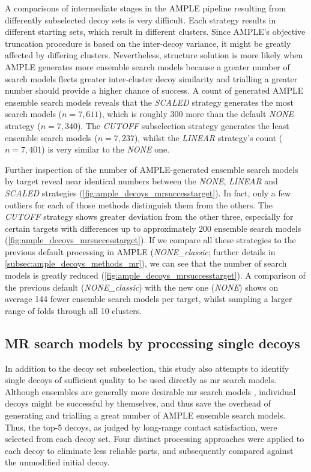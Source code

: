 A comparisons of intermediate stages in the AMPLE pipeline resulting from differently subselected decoy sets is very difficult. Each strategy results in different starting sets, which result in different clusters. Since AMPLE's objective truncation procedure is based on the inter-decoy variance, it might be greatly affected by differing clusters. Nevertheless, structure solution is more likely when AMPLE generates more ensemble search models because a greater number of search models flects greater inter-cluster decoy similarity and trialling a greater number should provide a higher chance of success. A count of generated AMPLE ensemble search models reveals that the \textit{SCALED} strategy generates the most search models ($n=7,611$), which is roughly 300 more than the default \textit{NONE} strategy ($n=7,340$). The \textit{CUTOFF} subselection strategy generates the least ensemble search models ($n=7,237$), whilst the \textit{LINEAR} strategy's count ($n=7,401$) is very similar to the \textit{NONE} one.

Further inspection of the number of AMPLE-generated ensemble search models by target reveal near identical numbers between the \textit{NONE}, \textit{LINEAR} and \textit{SCALED} strategies (\cref{fig:ample_decoys_mrsuccesstarget}). In fact, only a few outliers for each of those methods distinguish them from the others. The \textit{CUTOFF} strategy shows greater deviation from the other three, especially for certain targets with differences up to approximately 200 ensemble search models (\cref{fig:ample_decoys_mrsuccesstarget}). If we compare all these strategies to the previous default processing in AMPLE (\textit{NONE\_classic}; further details in \cref{subsec:ample_decoys_methods_mr}), we can see that the number of search models is greatly reduced (\cref{fig:ample_decoys_mrsuccesstarget}). A comparison of the previous default (\textit{NONE\_classic}) with the new one (\textit{NONE}) shows on average 144 fewer ensemble search models per target, whilst sampling a larger range of folds through all 10 clusters.

\subsection{MR search models by processing single decoys}
In addition to the decoy set subselection, this study also attempts to identify single decoys of sufficient quality to be used directly as \gls{mr} search models. Although ensembles are generally more desirable \gls{mr} search models \cite{Rigden2018-zt,Keegan2018-kn,Thomas2015-wu}, individual decoys might be successful by themselves, and thus save the overhead of generating and trialling a great number of AMPLE ensemble search models. Thus, the top-5 decoys, as judged by long-range contact satisfaction, were selected from each decoy set. Four distinct processing approaches were applied to each decoy to eliminate less reliable parts, and subsequently compared against the unmodified initial decoy.


